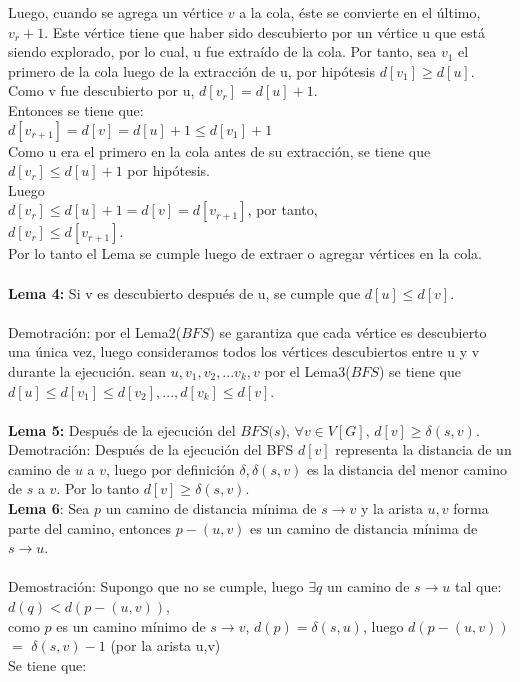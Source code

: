 \documentclass[12pt]{article}
\begin{document}
Luego, cuando se agrega un v\'ertice $v$ a la cola, \'este se convierte en el \'ultimo, $v_r+1$. Este v\'ertice tiene que haber sido descubierto por un v\'ertice
u  que est\'a siendo explorado, por lo cual, u fue extra\'ido de la cola.  Por tanto, sea $v_1$ el primero de la cola luego de la extracci\'on
de u, por hip\'otesis $d[v_1] \geq d [u]$. Como v fue descubierto por u, $d[v_r] = d [u]+1$.\\

Entonces se tiene que:\\
 $d[v_{r + 1}] = d[v] = d[u] + 1 \leq d[v_1] + 1$\\
  Como u era el primero en la cola antes de su extracci\'on, se tiene que 
$d[v_r] \leq d[u] + 1$ por hip\'otesis.\\
  Luego \\ 
  $d[v_r] \leq d[u] + 1 = d[v] = d[v_{r+1}]$, por tanto,\\
   $d[v_r]  \leq d[v_{r+1}]$.\\
Por lo tanto el Lema se cumple luego de extraer o agregar v\'ertices en la cola.\\
\\

\textbf{ Lema 4:} Si v es descubierto despu\'es de u, se cumple que $d[u] \leq d[v]$.\\
\\
Demotraci\'on: por el Lema2($BFS$) se garantiza que cada v\'ertice es descubierto una \'unica vez, luego consideramos todos los v\'ertices descubiertos entre u y v durante la ejecuci\'on.
sean $u, v_1, v_2,...v_k, v$ por el Lema3($BFS$) se tiene que $d[u] \leq d[v_1] \leq d[v_2],...,d[v_k]\leq d[v]$.\\
\\
 
\textbf{Lema 5:} Despu\'es de la ejecuci\'on del $BFS(s$), $\forall  v \in V[G]$, $d[v] \geq \delta(s,v)$.\\

Demotraci\'on: Despu\'es de la ejecuci\'on del BFS $d[v]$ representa la distancia de un camino de $u$ a $v$, luego por definici\'on 
$\delta, \delta(s,v)$ es la distancia del menor camino de $s$ a $v$.  Por lo tanto $d[v] \geq \delta (s, v)$.\\


\textbf{Lema 6}: Sea $p$ un camino de distancia m\'inima de $s \rightarrow v$ y la arista $u,v$ forma parte del camino, entonces $p - (u,v)$ es un camino de distancia m\'inima de $s \rightarrow u$.\\
\\
Demostraci\'on: 
Supongo que no se cumple, luego $ \exists q$ un camino de $s \rightarrow u$ tal que:
 $d(q) < d(p-(u,v))$,\\
  como $p$ es un camino m\'inimo de $s \rightarrow v$, $d(p) =\delta(s,u)$,
luego $d(p - (u,v))$ $=$ $\delta(s,v) - 1$ (por la arista u,v)\\
Se tiene que:\\
\end{document}

